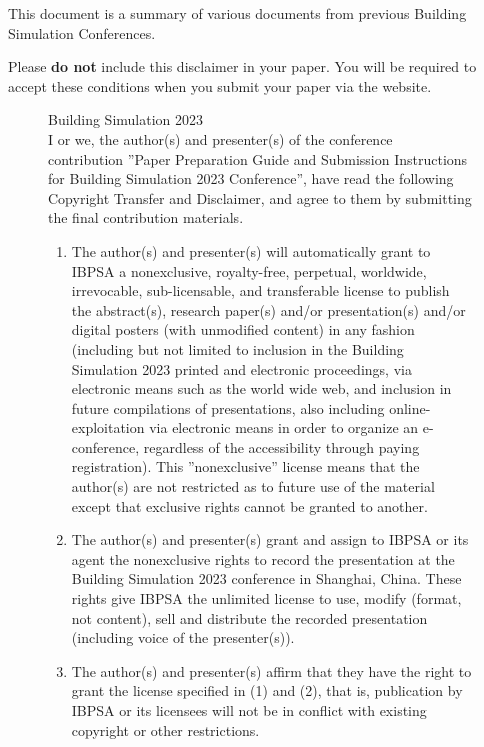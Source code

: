 \documentclass[twocolumn, a4paper,10pt]{article}
\begin{document}
This document is a summary of various documents from previous Building Simulation Conferences.




\newpage
\onecolumn
Please \textbf{do not} include this disclaimer in your paper. You will be required to accept these conditions when you submit your paper via the website.

\begin{figure}[ht]
\centering
\begin{boxedminipage}{\textwidth}
Building Simulation 2023\\
 
I or we, the author(s) and presenter(s) of the conference contribution ''Paper Preparation Guide and Submission Instructions for Building Simulation 2023 Conference'', have read the following Copyright Transfer and Disclaimer, and agree to them by submitting the final contribution materials.
 
  \begin{enumerate}
  \item The author(s) and presenter(s) will automatically grant to IBPSA a nonexclusive, royalty-free, perpetual, worldwide, irrevocable, sub-licensable, and transferable license to publish the abstract(s), research paper(s) and/or presentation(s) and/or digital posters (with unmodified content) in any fashion (including but not limited to inclusion in the Building Simulation 2023 printed and electronic proceedings, via electronic means such as the world wide web, and inclusion in future compilations of presentations, also including online-exploitation via electronic means in order to organize an e-conference, regardless of the accessibility through paying registration). This ''nonexclusive'' license means that the author(s) are not restricted as to future use of the material except that exclusive rights cannot be granted to another.
 
  \item The author(s) and presenter(s) grant and assign to IBPSA or its agent the nonexclusive rights to record the presentation at the Building Simulation 2023 conference in Shanghai, China. These rights give IBPSA the unlimited license to use, modify (format, not content), sell and distribute the recorded presentation (including voice of the presenter(s)).
   
  \item The author(s) and presenter(s) affirm that they have the right to grant the license specified in (1) and (2), that is, publication by IBPSA or its licensees will not be in conflict with existing copyright or other restrictions.
   

\end{enumerate}
\end{boxedminipage}
\end{figure}
\end{document}
